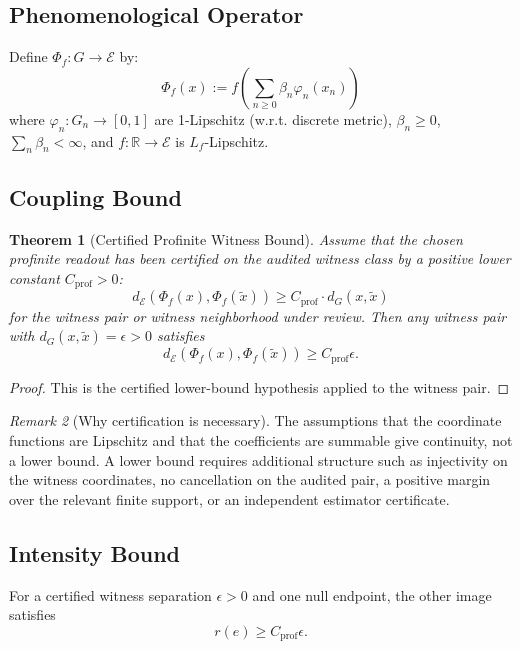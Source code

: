 \documentclass[11pt,a4paper]{article}
\theoremstyle{plain}
\newtheorem{theorem}{Theorem}[section]
\theoremstyle{definition}
\theoremstyle{remark}
\newtheorem{remark}[theorem]{Remark}
\newcommand{\E}{\mathcal{E}}
\newcommand{\dE}{d_{\mathcal{E}}}
\begin{document}
\subsection{Phenomenological Operator}

Define $\Phi_f: G \to \E$ by:
\[
\Phi_f(x) := f\left( \sum_{n \geq 0} \beta_n \varphi_n(x_n) \right)
\]
where $\varphi_n: G_n \to [0,1]$ are 1-Lipschitz (w.r.t. discrete metric), $\beta_n \geq 0$, $\sum_n \beta_n < \infty$, and $f: \mathbb{R} \to \E$ is $L_f$-Lipschitz.

\subsection{Coupling Bound}

\begin{theorem}[Certified Profinite Witness Bound]
Assume that the chosen profinite readout has been certified on the audited witness class by a positive lower constant $C_{\mathrm{prof}}>0$:
\[
\dE(\Phi_f(x), \Phi_f(\tilde{x})) \geq C_{\mathrm{prof}} \cdot d_G(x, \tilde{x})
\]
for the witness pair or witness neighborhood under review. Then any witness pair with $d_G(x,\tilde{x})=\epsilon>0$ satisfies
\[
\dE(\Phi_f(x),\Phi_f(\tilde{x}))\geq C_{\mathrm{prof}}\epsilon.
\]
\end{theorem}

\begin{proof}
This is the certified lower-bound hypothesis applied to the witness pair.
\end{proof}

\begin{remark}[Why certification is necessary]
The assumptions that the coordinate functions are Lipschitz and that the coefficients are summable give continuity, not a lower bound. A lower bound requires additional structure such as injectivity on the witness coordinates, no cancellation on the audited pair, a positive margin over the relevant finite support, or an independent estimator certificate.
\end{remark}

\subsection{Intensity Bound}

For a certified witness separation $\epsilon>0$ and one null endpoint, the other image satisfies
\[
r(e) \geq C_{\mathrm{prof}}\epsilon.
\]

\end{document}
